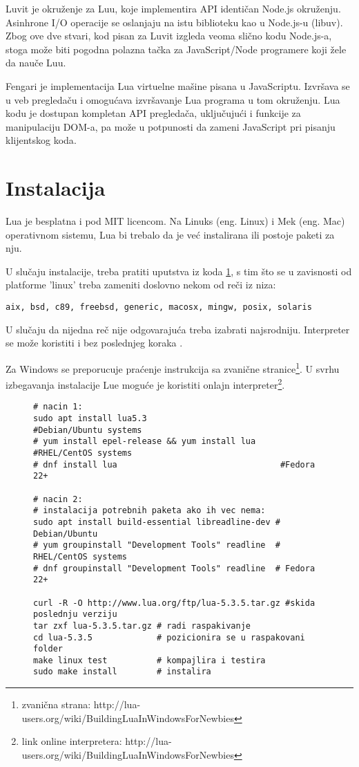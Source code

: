 \documentclass[a4paper]{article}
\begin{document}
Luvit je okruženje za Luu, koje implementira API identičan Node.js\cite{node_js} okruženju. Asinhrone I/O operacije se oslanjaju na istu biblioteku kao u Node.js-u (libuv). Zbog ove dve stvari, kod pisan za Luvit izgleda veoma slično kodu Node.js-a, stoga može biti pogodna polazna tačka za JavaScript/Node programere koji žele da nauče Luu. 

Fengari je implementacija Lua virtuelne mašine pisana u JavaScriptu. Izvršava se u veb pregledaču i omogućava izvršavanje Lua programa u tom okruženju. Lua kodu je dostupan kompletan API pregledača, uključujući i funkcije za manipulaciju DOM-a, pa može u potpunosti da zameni JavaScript pri pisanju klijentskog koda\cite{frameworkFengari}.


\section{Instalacija}
\label{sec:instalacija}
  Lua je besplatna i pod MIT licencom. %
Na Linuks (eng. Linux) i Mek (eng. Mac) operativnom sistemu, Lua bi trebalo da je već instalirana ili postoje paketi za nju. 

U slučaju instalacije, treba pratiti uputstva iz koda \ref{kod_instalacija}, s tim što se u zavisnosti od platforme 'linux' treba zameniti doslovno nekom od reči iz niza:
\begin{verbatim}
aix, bsd, c89, freebsd, generic, macosx, mingw, posix, solaris
\end{verbatim}
 U slučaju da nijedna reč nije odgovarajuća treba izabrati najsrodniju. Interpreter se može koristiti i bez poslednjeg koraka \cite{lua_org}.

 Za Windows se preporucuje praćenje instrukcija sa zvanične stranice\footnote{zvanična strana: http://lua-users.org/wiki/BuildingLuaInWindowsForNewbies}. U svrhu izbegavanja instalacije Lue moguće je koristiti onlajn interpreter\footnote{link online interpretera: http://lua-users.org/wiki/BuildingLuaInWindowsForNewbies}.

\begin{figure}

\begin{lstlisting}[caption={Instalacija iz terminala na linuxu},frame=single, label=simple]
# nacin 1:
sudo apt install lua5.3	                      #Debian/Ubuntu systems 
# yum install epel-release && yum install lua	#RHEL/CentOS systems 
# dnf install lua		                          #Fedora 22+

# nacin 2:
# instalacija potrebnih paketa ako ih vec nema:
sudo apt install build-essential libreadline-dev # Debian/Ubuntu
# yum groupinstall "Development Tools" readline	 # RHEL/CentOS systems 
# dnf groupinstall "Development Tools" readline	 # Fedora 22+

curl -R -O http://www.lua.org/ftp/lua-5.3.5.tar.gz #skida poslednju verziju
tar zxf lua-5.3.5.tar.gz # radi raspakivanje
cd lua-5.3.5             # pozicionira se u raspakovani folder 
make linux test          # kompajlira i testira
sudo make install        # instalira
\end{lstlisting}
\label{kod_instalacija}
\end{figure}
\end{document}
